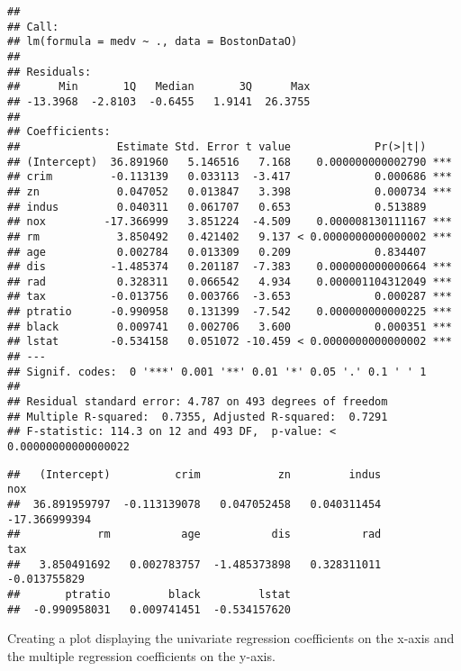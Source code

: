 \documentclass[]{article}
\newenvironment{Shaded}{\begin{snugshade}}{\end{snugshade}}
\newcommand{\CommentTok}[1]{\textcolor[rgb]{0.56,0.35,0.01}{\textit{#1}}}
\newcommand{\NormalTok}[1]{#1}
\newcommand{\OperatorTok}[1]{\textcolor[rgb]{0.81,0.36,0.00}{\textbf{#1}}}
\begin{document}
\begin{verbatim}
## 
## Call:
## lm(formula = medv ~ ., data = BostonDataO)
## 
## Residuals:
##      Min       1Q   Median       3Q      Max 
## -13.3968  -2.8103  -0.6455   1.9141  26.3755 
## 
## Coefficients:
##               Estimate Std. Error t value             Pr(>|t|)    
## (Intercept)  36.891960   5.146516   7.168    0.000000000002790 ***
## crim         -0.113139   0.033113  -3.417             0.000686 ***
## zn            0.047052   0.013847   3.398             0.000734 ***
## indus         0.040311   0.061707   0.653             0.513889    
## nox         -17.366999   3.851224  -4.509    0.000008130111167 ***
## rm            3.850492   0.421402   9.137 < 0.0000000000000002 ***
## age           0.002784   0.013309   0.209             0.834407    
## dis          -1.485374   0.201187  -7.383    0.000000000000664 ***
## rad           0.328311   0.066542   4.934    0.000001104312049 ***
## tax          -0.013756   0.003766  -3.653             0.000287 ***
## ptratio      -0.990958   0.131399  -7.542    0.000000000000225 ***
## black         0.009741   0.002706   3.600             0.000351 ***
## lstat        -0.534158   0.051072 -10.459 < 0.0000000000000002 ***
## ---
## Signif. codes:  0 '***' 0.001 '**' 0.01 '*' 0.05 '.' 0.1 ' ' 1
## 
## Residual standard error: 4.787 on 493 degrees of freedom
## Multiple R-squared:  0.7355, Adjusted R-squared:  0.7291 
## F-statistic: 114.3 on 12 and 493 DF,  p-value: < 0.00000000000000022
\end{verbatim}

\begin{Shaded}
\end{Shaded}

\begin{verbatim}
##   (Intercept)          crim            zn         indus           nox 
##  36.891959797  -0.113139078   0.047052458   0.040311454 -17.366999394 
##            rm           age           dis           rad           tax 
##   3.850491692   0.002783757  -1.485373898   0.328311011  -0.013755829 
##       ptratio         black         lstat 
##  -0.990958031   0.009741451  -0.534157620
\end{verbatim}

\item

Creating a plot displaying the univariate regression coefficients on the
x-axis and the multiple regression coefficients on the y-axis.
\end{document}
